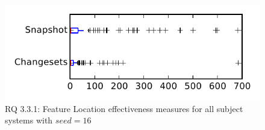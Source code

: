 
\begin{figure}
\centering
\includegraphics[height=0.4\textheight]{figures/flt_seed/rq1_tiny_16}
\caption{RQ 3.3.1: Feature Location effectiveness measures for all subject systems with $seed=16$}
\label{fig:flt_seed:rq1:tiny}
\end{figure}
